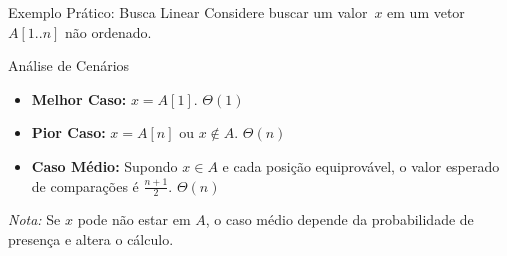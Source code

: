 \documentclass[aspectratio=169]{beamer}
\begin{document}
\begin{frame}[shrink]{Exemplo Prático: Busca Linear}
    Considere buscar um valor~$x$ em um vetor~$A[1..n]$ não ordenado.

    \begin{exampleblock}{Análise de Cenários}
        \begin{itemize}
            \item \textbf{Melhor Caso:} $x = A[1]$.
                  \hfill $\Theta(1)$
            \item \textbf{Pior Caso:} $x = A[n]$ ou $x \notin A$.
                  \hfill $\Theta(n)$
            \item \textbf{Caso Médio:}
                  Supondo $x \in A$ e cada posição equiprovável,
                  o valor esperado de comparações é $\frac{n+1}{2}$.
                  \hfill $\Theta(n)$
        \end{itemize}
    \end{exampleblock}

    \centering

    \medskip
    {\small\textit{Nota:} Se $x$ pode não estar em $A$, o caso médio depende
    da probabilidade de presença e altera o cálculo.}
\end{frame}
\end{document}
